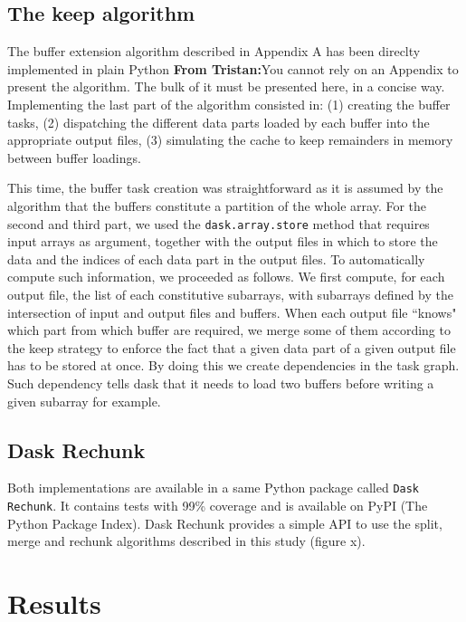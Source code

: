 \documentclass[conference]{IEEEtran}
\newcommand{\tristan}[1]{\color{orange}\textbf{From Tristan:}#1\color{black}}
\begin{document}
\subsection{The keep algorithm}

The buffer extension algorithm described in Appendix A has been direclty
implemented in plain Python \tristan{You cannot rely on an Appendix to present the algorithm. The bulk of it must be presented here, in a
concise way}. Implementing the last part of the algorithm
consisted in: (1) creating the buffer tasks, (2) dispatching the different data
parts loaded by each buffer into the appropriate output files, (3) simulating
the cache to keep remainders in memory between buffer loadings.

This time, the buffer task creation was straightforward as it is assumed by the
algorithm that the buffers constitute a partition of the whole array. For the
second and third part, we used the \texttt{dask.array.store} method that
requires input arrays as argument, together with the output files in which to
store the data and the indices of each data part in the output files. To
automatically compute such information, we proceeded as follows. We first
compute, for each output file, the list of each constitutive subarrays, with
subarrays defined by the intersection of input and output files and buffers.
When each output file ``knows" which part from which buffer are required, we
merge some of them according to the keep strategy to enforce the fact that
a given data part of a given output file has to be stored at once. By doing this
we create dependencies in the task graph. Such dependency tells dask that it
needs to load two buffers before writing a given subarray for example.

\subsection{Dask Rechunk}

Both implementations are available in a same Python package called \texttt{Dask Rechunk}. It
contains tests with 99\% coverage and is available on PyPI (The Python Package
Index). Dask Rechunk provides a simple API to use the split, merge and rechunk
algorithms described in this study (figure x).

\section{Results}
\end{document}

